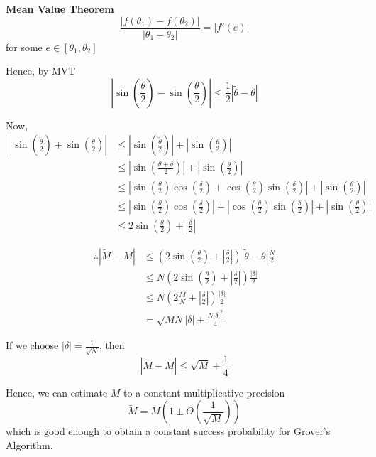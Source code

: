 \documentclass[11.5pt, paper=a4]{article}
\theoremstyle{definition}
\numberwithin{theorem}{section}
\begin{document}
\textbf{Mean Value Theorem}
\begin{equation}
    \dfrac{|f(\theta_1) - f(\theta_2)|}{|\theta_1 - \theta_2|} = |f'(e)|
\end{equation}
for some $e \in [\theta_1, \theta_2]$

\vspace{5mm}
Hence, by MVT
\begin{equation}
    |\sin(\frac{\tilde{\theta}}{2}) - \sin(\frac{\theta}{2})| \leq \frac{1}{2}|\tilde{\theta} - \theta|
\end{equation}

Now,
\begin{align*}
    |\sin(\frac{\tilde{\theta}}{2}) + \sin(\frac{\theta}{2})| &\leq |\sin(\frac{\tilde{\theta}}{2})| + |\sin(\frac{\theta}{2})| \\
    &\leq |\sin(\frac{\theta + \delta}{2})| + |\sin(\frac{\theta}{2})| \\
    &\leq |\sin(\frac{\theta}{2})\cos(\frac{\delta}{2}) + \cos(\frac{\theta}{2})\sin(\frac{\delta}{2})| + |\sin(\frac{\theta}{2})|\\
    &\leq |\sin(\frac{\theta}{2})\cos(\frac{\delta}{2})| + |\cos(\frac{\theta}{2})\sin(\frac{\delta}{2})| + |\sin(\frac{\theta}{2})|\\
    &\leq 2 \sin(\frac{\theta}{2}) + |\frac{\delta}{2}|
\end{align*}

\begin{align*}
    \therefore |\tilde{M} - M| &\leq (2 \sin(\frac{\theta}{2}) + |\frac{\delta}{2}|) |\tilde{\theta} - \theta| \frac{N}{2} \\
    &\leq N (2 \sin(\frac{\theta}{2}) + |\frac{\delta}{2}|) \frac{|\delta|}{2} \\
    &\leq N (2 \frac{M}{N} + |\frac{\delta}{2}|) \frac{|\delta|}{2} \\
    &= \sqrt{MN} |\delta| + \frac{N|\delta|^2}{4}
\end{align*}

If we choose $|\delta| = \frac{1}{\sqrt{N}}$, then
\begin{equation}
    |\tilde{M} - M| \leq \sqrt{M} + \frac{1}{4}
\end{equation}

Hence, we can estimate $M$ to a constant multiplicative precision
\begin{equation}
    \tilde{M} = M (1 \pm O(\frac{1}{\sqrt{M}}))
\end{equation}
which is good enough to obtain a constant success probability for Grover's Algorithm. 
\end{document}
